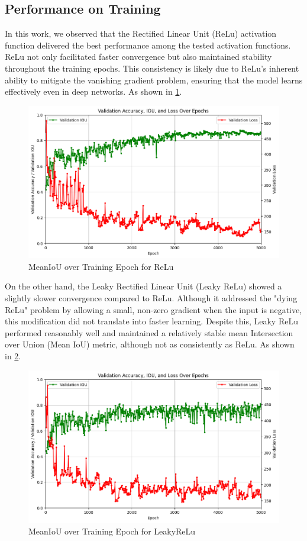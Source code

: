 \documentclass[conference]{IEEEtran}
\begin{document}
\subsection{Performance on Training}
In this work, we observed that the Rectified Linear Unit (ReLu) activation function delivered the best performance among the tested activation functions. ReLu not only facilitated faster convergence but also maintained stability throughout the training epochs. This consistency is likely due to ReLu’s inherent ability to mitigate the vanishing gradient problem, ensuring that the model learns effectively even in deep networks. As shown in \ref{fig:perf_relu}.
\begin{figure}[h]
    \centering
    \includegraphics[width=\columnwidth]{relu_perf.png} %
    \caption{MeanIoU over Training Epoch for ReLu}
    \label{fig:perf_relu}
\end{figure}
On the other hand, the Leaky Rectified Linear Unit (Leaky ReLu) showed a slightly slower convergence compared to ReLu. Although it addressed the "dying ReLu" problem by allowing a small, non-zero gradient when the input is negative, this modification did not translate into faster learning. Despite this, Leaky ReLu performed reasonably well and maintained a relatively stable mean Intersection over Union (Mean IoU) metric, although not as consistently as ReLu. As shown in \ref{fig:perf_leaky}.
\begin{figure}[!t]
    \centering
    \includegraphics[width=\columnwidth]{leaky_perf.png} %
    \caption{MeanIoU over Training Epoch for LeakyReLu}
    \label{fig:perf_leaky}
\end{figure}
\end{document}
